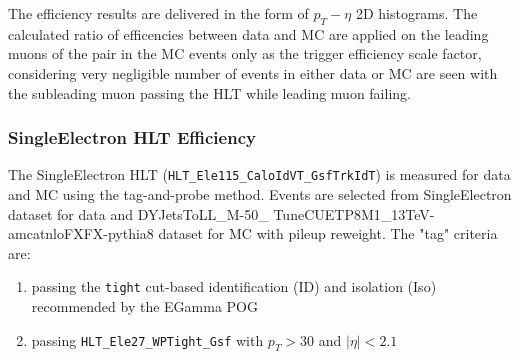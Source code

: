 \vspace{0.3cm}
The efficiency results are delivered in the form of $p_T - \eta$ 2D histograms. The calculated ratio of efficencies between data and MC are applied on the leading muons of the pair in the MC events only as the trigger efficiency scale factor, considering very negligible number of events in either data or MC are seen with the subleading muon passing the HLT while leading muon failing.

\subsubsection{SingleElectron HLT Efficiency}
The SingleElectron HLT (\texttt{HLT\_Ele115\_CaloIdVT\_GsfTrkIdT}) is measured for data and MC using the tag-and-probe method. Events are selected from SingleElectron dataset for data and DYJetsToLL\_M-50\_ TuneCUETP8M1\_13TeV-amcatnloFXFX-pythia8 dataset for MC with pileup reweight. The "tag" criteria are:
\begin{enumerate}
\item passing the \texttt{tight} cut-based identification (ID) and isolation (Iso) recommended by the EGamma POG %
\item passing \texttt{HLT\_Ele27\_WPTight\_Gsf} with $p_T>30$ and $|\eta|<2.1$
\end{enumerate}


